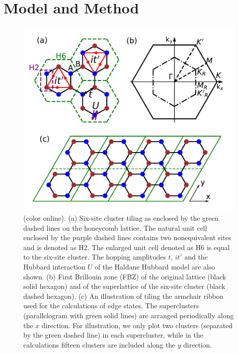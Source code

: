 \documentclass[12pt]{iopart}
\begin{document}
\section{Model and Method}\label{MM}

\begin{figure}
\centering
\includegraphics[scale=1.0]{lattice}
\caption{(color online). (a) Six-site cluster tiling as enclosed by the green dashed lines on the honeycomb lattice. The natural unit cell enclosed by the purple dashed lines contains two nonequivalent sites and is denoted as H2. The enlarged unit cell denoted as H6 is equal to the six-site cluster. The hopping amplitudes $t$, $it'$ and the Hubbard interaction $U$ of the Haldane Hubbard model are also shown. (b) First Brillouin zone (FBZ) of the original lattice (black solid hexagon) and of the superlattice of the six-site cluster (black dashed hexagon). (c) An illustration of tiling the armchair ribbon used for the calculations of edge states. The superclusters (parallelogram with green solid lines) are arranged periodically along the $x$ direction. For illustration, we only plot two clusters (separated by the green dashed line) in each supercluster, while in the calculations fifteen clusters are included along the $y$ direction.}\label{lattice}
\end{figure}
\end{document}
